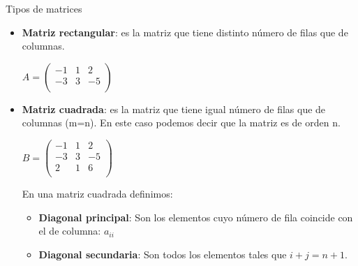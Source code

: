 \documentclass[9pt]{beamer}
\begin{document}
\begin{frame}{Tipos de matrices}


\begin{itemize}[<+-| alert@+>] 
 	\item  {\bf Matriz rectangular}: es la matriz que tiene distinto número de filas que de columnas.
 
  		$A= \begin{pmatrix}  -1 & 1  & 2  \\  -3  & 3 & -5 \\\end{pmatrix}$

	\item {\bf Matriz cuadrada}: es la matriz que tiene igual número de filas que de columnas (m=n). En este caso podemos decir que la matriz es de orden n. 

  	$B= \begin{pmatrix}  -1 & 1  & 2  \\  -3  & 3 & -5 \\  2  & 1 & 6 \\\end{pmatrix}$

\pause  
  	En una matriz cuadrada definimos:
  \begin{itemize}[<+->]
  \item {\bf Diagonal principal}: Son los elementos cuyo número de fila coincide con el de columna: $a_{ii}$
  \item {\bf Diagonal secundaria}: Son todos los elementos tales que $i+j=n+1$.
  \end{itemize}
  
\end{itemize}
\pause
\begin{columns}
\begin{center}


\end{center}
\end{columns}
\end{frame}
\end{document}
